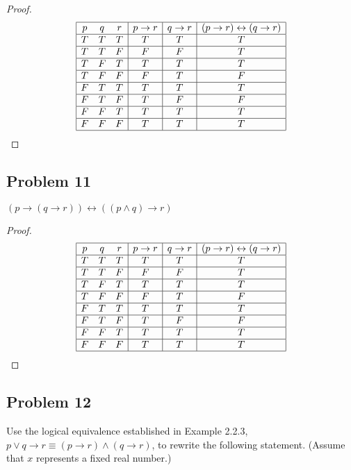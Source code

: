 \documentclass[14pt]{extarticle}
\newcommand{\bic}{\leftrightarrow}
\begin{document}
\begin{proof}
$$
\begin{array}{|ccc|c|c|c|}
\hline
p & q & r & p \to r & q \to r & (p \to r) \bic (q \to r) \\
\hline
T & T & T & T & T & T \\
\hline
T & T & F & F & F & T \\
\hline
T & F & T & T & T & T \\
\hline
T & F & F & F & T & F \\
\hline
F & T & T & T & T & T \\
\hline
F & T & F & T & F & F \\
\hline
F & F & T & T & T & T \\
\hline
F & F & F & T & T & T \\
\hline
\end{array}
$$
\end{proof}

\subsection{Problem 11}
$(p \to (q \to r)) \bic ((p \wedge q) \to r)$

\begin{proof}
$$
\begin{array}{|ccc|c|c|c|}
\hline
p & q & r & p \to r & q \to r & (p \to r) \bic (q \to r) \\
\hline
T & T & T & T & T & T \\
\hline
T & T & F & F & F & T \\
\hline
T & F & T & T & T & T \\
\hline
T & F & F & F & T & F \\
\hline
F & T & T & T & T & T \\
\hline
F & T & F & T & F & F \\
\hline
F & F & T & T & T & T \\
\hline
F & F & F & T & T & T \\
\hline
\end{array}
$$
\end{proof}

\subsection{Problem 12}
Use the logical equivalence established in Example 2.2.3, $p \vee q \to r \equiv
(p \to r) \wedge (q \to r)$, to rewrite the following statement. (Assume that
$x$ represents a fixed real number.)
\end{document}

